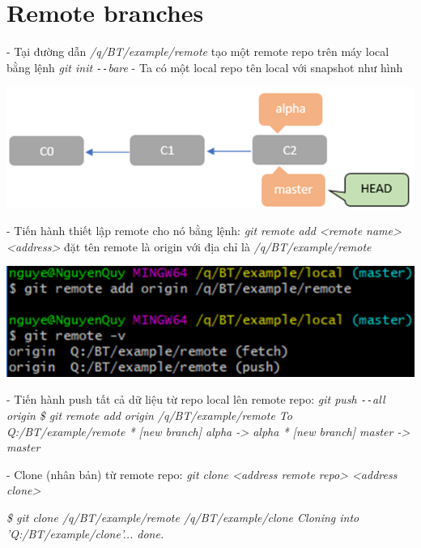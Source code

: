 \documentclass[12pt,a4paper]{report}
\begin{document}
	\label{fig:screenshot064}

	\vskip 0.4cm	\vskip 0.4cm
			\newpage			
\section{Remote branches}
\hspace{0.6cm}- Tại đường dẫn {\it /q/BT/example/remote} tạo một remote repo trên máy local bằng lệnh {\it git init \texttt{-{}-}bare} \vskip 0.4cm
- Ta có một local repo tên local với snapshot như hình\vskip 0.4cm

	\includegraphics[width=0.8\linewidth]{screenshot065}
	
	\label{fig:screenshot065}\vskip 0.4cm\vskip 0.4cm

- Tiến hành thiết lập remote cho nó bằng lệnh: {\it git remote add <remote  name> <address>} đặt tên remote là origin với địa chỉ là {\it /q/BT/example/remote}\vskip 0.4cm

	\includegraphics[width=0.8\linewidth]{screenshot066}

	\label{fig:screenshot066}
\vskip 0.4cm\vskip 0.4cm
- Tiến hành push tất cả dữ liệu từ repo local lên remote repo: {\it git push \texttt{-{}-}all origin}
\vskip 0.4cm
{\it  \hspace{1cm}\$ git remote add origin /q/BT/example/remote\vskip 0.1cm
 \hspace{1cm}To Q:/BT/example/remote\vskip 0.1cm
 \hspace{1cm}* [new branch]      alpha -> alpha\vskip 0.1cm
 \hspace{1cm}* [new branch]      master -> master}\vskip 0.4cm

 - Clone (nhân bản) từ remote repo: {\it git clone <address remote repo> <address clone>}\vskip 0.4cm
 
 {\it \hspace{1cm} \$ git clone /q/BT/example/remote /q/BT/example/clone\vskip 0.1cm
 \hspace{1cm} Cloning into 'Q:/BT/example/clone'...\vskip 0.1cm
 \hspace{1cm} done.}\vskip 0.4cm
 
\end{document}
